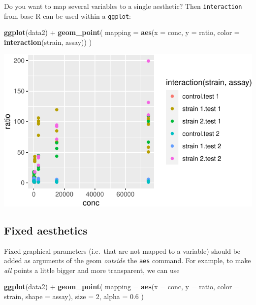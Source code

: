 \documentclass[]{book}
\newenvironment{Shaded}{}{}
\newcommand{\DataTypeTok}[1]{\textcolor[rgb]{0.56,0.13,0.00}{#1}}
\newcommand{\DecValTok}[1]{\textcolor[rgb]{0.25,0.63,0.44}{#1}}
\newcommand{\FloatTok}[1]{\textcolor[rgb]{0.25,0.63,0.44}{#1}}
\newcommand{\KeywordTok}[1]{\textcolor[rgb]{0.00,0.44,0.13}{\textbf{#1}}}
\newcommand{\NormalTok}[1]{#1}
\newcommand{\OperatorTok}[1]{\textcolor[rgb]{0.40,0.40,0.40}{#1}}
\newcommand{\StringTok}[1]{\textcolor[rgb]{0.25,0.44,0.63}{#1}}
\begin{document}
Do you want to map several variables to a single aesthetic? Then \texttt{interaction} from base R can be used within a \texttt{ggplot}:

\begin{Shaded}
\begin{Highlighting}[]
\KeywordTok{ggplot}\NormalTok{(data2) }\OperatorTok{+}
\StringTok{  }\KeywordTok{geom_point}\NormalTok{(}
    \DataTypeTok{mapping =} \KeywordTok{aes}\NormalTok{(}\DataTypeTok{x =}\NormalTok{ conc, }\DataTypeTok{y =}\NormalTok{ ratio, }\DataTypeTok{color =} \KeywordTok{interaction}\NormalTok{(strain, assay))}
\NormalTok{  )}
\end{Highlighting}
\end{Shaded}

\begin{center}\includegraphics[width=\textwidth]{TRES-Tidy-Tutorial_files/figure-latex/unnamed-chunk-111-1} \end{center}

\hypertarget{fixed-aesthetics}{%
\subsection{Fixed aesthetics}\label{fixed-aesthetics}}

Fixed graphical parameters (i.e.~that are not mapped to a variable) should be added as arguments of the geom \emph{outside} the \texttt{aes} command. For example, to make \emph{all} points a little bigger and more transparent, we can use

\begin{Shaded}
\begin{Highlighting}[]
\KeywordTok{ggplot}\NormalTok{(data2) }\OperatorTok{+}
\StringTok{  }\KeywordTok{geom_point}\NormalTok{(}
    \DataTypeTok{mapping =} \KeywordTok{aes}\NormalTok{(}\DataTypeTok{x =}\NormalTok{ conc, }\DataTypeTok{y =}\NormalTok{ ratio, }\DataTypeTok{color =}\NormalTok{ strain, }\DataTypeTok{shape =}\NormalTok{ assay),}
    \DataTypeTok{size =} \DecValTok{2}\NormalTok{, }\DataTypeTok{alpha =} \FloatTok{0.6}
\NormalTok{  )}
\end{Highlighting}
\end{Shaded}
\end{document}
